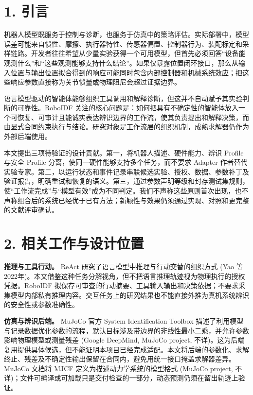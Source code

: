 \documentclass[
  chinese,
  11pt,
  a4paper,
  fontset=fandol]{ctexart}
\begin{document}
\section{1. 引言}\label{ux5f15ux8a00}

机器人模型既服务于控制与诊断，也服务于仿真中的策略评估。实际部署中，模型误差可能来自惯性、摩擦、执行器特性、传感器偏置、控制器行为、装配标定和采样链路。开发者往往希望从少量实验获得一个可用模型，但首先必须回答``设备能观测什么''和``这些观测能够支持什么结论''。如果仅暴露位置闭环接口，那么从输入位置与输出位置拟合得到的响应可能同时包含内部控制器和机械系统效应；把这些响应参数直接称为关节惯量或物理阻尼会超过证据边界。

语言模型驱动的智能体能够组织工具调用和解释诊断，但这并不自动赋予其实验判断的可靠性。RoboIDF
关注的核心问题是：如何把具有不确定性的智能体放入一个可恢复、可审计且能诚实表达辨识边界的工作流，使其负责提出和解释决策，而由显式合同约束执行与结论。研究对象是工作流层的组织机制，成熟求解器仍作为外部后端使用。

本文提出三项待验证的设计贡献。第一，将机器人描述、硬件能力、辨识 Profile
与安全 Profile 分离，使同一硬件能够支持多个任务，而不要求 Adapter
作者替代实验专家。第二，以运行状态和事件记录串联候选实验、授权、数据、参数补丁及验证报告，明确重试和恢复的语义。第三，通过参数声明等级和封存测试集规则，使``工作流完成''与``模型有效''成为不同判定。我们不声称这些原则首次出现，也不声称组合后的系统已经优于已有方法；新颖性与效果仍须通过实现、对照和更完整的文献评审确认。

\section{2.
相关工作与设计位置}\label{ux76f8ux5173ux5de5ux4f5cux4e0eux8bbeux8ba1ux4f4dux7f6e}

\textbf{推理与工具行动。} ReAct 研究了语言模型中推理与行动交替的组织方式
(Yao 等
2022年)。本文借鉴这种任务分解视角，但不把语言推理轨迹视为物理执行的授权凭据。RoboIDF
拟保存可审查的行动摘要、工具输入输出和决策依据；不要求采集模型内部私有推理内容。交互任务上的研究结果也不能直接外推为真机系统辨识的安全性或参数准确性。

\textbf{仿真与辨识后端。} MuJoCo 官方 System Identification Toolbox
描述了利用模型与记录数据优化参数的流程，默认目标涉及带边界的非线性最小二乘，并允许参数影响物理模型或测量残差
(Google DeepMind, MuJoCo project,
不详)。这为后端复用提供具体候选，但不能证明本项目已经完成适配。本文将后端的参数化、求解终止、残差及不确定性输出保留在合同内，避免用统一接口掩盖求解器差异。MuJoCo
文档将 MJCF 定义为描述动力学系统的模型格式 (MuJoCo project,
不详)；文件可编译或可加载只是交付检查的一部分，动态预测仍须在留出轨迹上验证。
\end{document}
